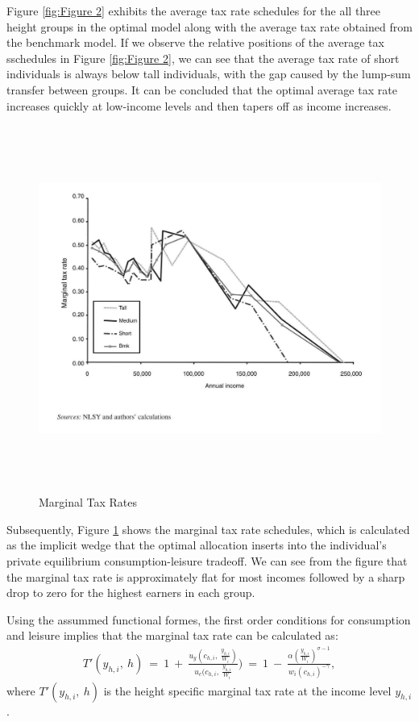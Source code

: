 \documentclass[titlepage]{\econtex}
\begin{document}
  Figure \ref{fig:Figure 2} exhibits the average tax rate schedules for the all three height groups in the optimal model along with the average tax rate obtained from the benchmark model. If we observe the relative positions of the average tax sschedules in Figure  \ref{fig:Figure 2}, we can see that the average tax rate of short individuals is always below tall individuals, with the gap caused by the lump-sum transfer between groups. It can be concluded that the optimal average tax rate increases quickly at low-income levels and then tapers off as income increases. 

\begin{figure}[H]
  \centering
  \includegraphics[width=1\textwidth, height=12cm]{MarginalTax.JPG}
  \caption{Marginal Tax Rates}
    \label{fig:Figure 3}
  \end{figure} 

  Subsequently, Figure \ref{fig:Figure 3} shows the marginal tax rate schedules, which is calculated as the implicit wedge that the optimal allocation inserts into the individual's private equilibrium consumption-leisure tradeoff. We can see from the figure that the marginal tax rate is approximately flat for most incomes followed by a sharp drop to zero for the highest earners in each group.

  Using the assummed functional formes, the first order conditions for consumption and leisure implies that the marginal tax rate can be calculated as:
\begin{align}
  T'(y_{h,i}, \ h) \ = \ 1 \ + \ \frac{u_y(c_{h,i}, \ \frac{y_{h,i}}{W_i})}{u_c(c_{h,i}, \ \frac{y_{h,i}}{W_i}}) \ = \ 1 \ - \ \frac{\alpha(\frac{y_{h,i}}{W_i})^{\sigma-1}}{w_i(c_{h,i})^{-\gamma}},
\end{align}
where $T'(y_{h,i}, \ h)$ is the height specific marginal tax rate at the income level $y_{h,i}$.
  
\end{document}
